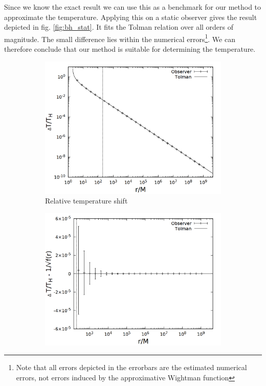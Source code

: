 Since we know the exact result we can use this as a benchmark for our method to approximate the temperature. Applying this on a static observer gives the result depicted in fig. \ref{fig:bh_stat}. It fits the Tolman relation over all orders of magnitude. The small difference lies within the numerical errors\footnote{Note that all errors depicted in the errorbars are the estimated numerical errors, not errors induced by the approximative Wightman function}. We can therefore conclude that our method is suitable for determining the temperature. 

\begin{figure}[h]
  \centering
  \begin{subfigure}[h]{0.5\textwidth}
    \centering
    \includegraphics[width=\textwidth]{cpp/final/stat.png}
    \caption{Relative temperature shift}
  \end{subfigure}%
  \begin{subfigure}[h]{0.5\textwidth}
    \centering
    \includegraphics[width=\textwidth]{cpp/final/stat_tolman.png}

\end{subfigure}
\end{figure}
